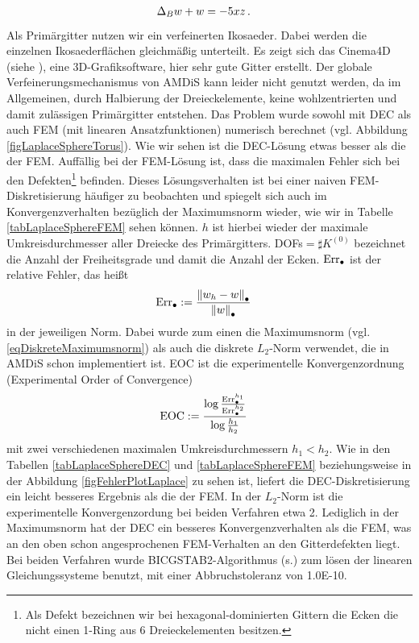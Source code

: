 \begin{beispiel}[Einheitssphäre]
\begin{align}
          \label{eqLaplaceSphereProblemUmform}
         \Delta_{B} w + w &= -5 x z \,\text{.}
       \end{align}
       Als Primärgitter nutzen wir ein verfeinerten Ikosaeder.
       Dabei werden die einzelnen Ikosaederflächen gleichmäßig unterteilt.
       Es zeigt sich das Cinema4D (siehe \cite{cinema4d}), eine 3D-Grafiksoftware, hier sehr gute Gitter erstellt.
       Der globale Verfeinerungsmechanismus von AMDiS kann leider nicht genutzt werden, da im Allgemeinen,
       durch Halbierung der Dreieckelemente, keine wohlzentrierten und damit zulässigen Primärgitter entstehen.
       Das Problem wurde sowohl mit DEC als auch FEM (mit linearen Ansatzfunktionen) 
       numerisch berechnet (vgl. Abbildung \ref{figLaplaceSphereTorus}).
       Wie wir sehen ist die DEC-Lösung etwas besser als die der FEM.
       Auffällig bei der FEM-Lösung ist, dass die maximalen Fehler sich bei den Defekten\footnote{Als Defekt bezeichnen wir bei
       hexagonal-dominierten Gittern die Ecken die nicht einen 1-Ring aus 6 Dreieckelementen besitzen.} 
       befinden.
       Dieses Lösungsverhalten ist bei einer naiven FEM-Diskretisierung häufiger zu beobachten und spiegelt sich auch im
       Konvergenzverhalten bezüglich der Maximumsnorm wieder, wie wir in Tabelle \ref{tabLaplaceSphereFEM} sehen können.
       \( h \) ist hierbei wieder der maximale Umkreisdurchmesser aller Dreiecke des Primärgitters.
       DOFs\( = \sharp K^{(0)} \) bezeichnet die Anzahl der Freiheitsgrade und damit die Anzahl der Ecken.
       \( \text{Err}_{\bullet} \) ist der relative Fehler, das heißt
       \begin{align}
         \text{Err}_{\bullet} &:= \frac{\left\| w_{h} - w \right\|_{\bullet}}{\left\| w \right\|_{\bullet}}
       \end{align}
       in der jeweiligen Norm.
       Dabei wurde zum einen die Maximumsnorm (vgl. \ref{eqDiskreteMaximumsnorm}) als auch die diskrete \(
       L_{2} \)-Norm verwendet,
       die in AMDiS schon implementiert ist.
       EOC ist die experimentelle Konvergenzordnung (Experimental Order of Convergence)
       \begin{align}
         \text{EOC} &:= \frac{\log\frac{\text{Err}_{\bullet}^{h_{1}}}{\text{Err}_{\bullet}^{h_{2}}}}
                             {\log\frac{h_{1}}{h_{2}}}
       \end{align}
       mit zwei verschiedenen maximalen Umkreisdurchmessern \( h_{1} < h_{2} \).
       Wie in den Tabellen \ref{tabLaplaceSphereDEC} und \ref{tabLaplaceSphereFEM} beziehungsweise in der
       Abbildung \ref{figFehlerPlotLaplace} zu sehen ist, liefert die DEC-Diskretisierung ein leicht
       besseres Ergebnis als die der FEM.
       In der \( L_{2} \)-Norm ist die experimentelle Konvergenzordung bei beiden Verfahren etwa 2.
       Lediglich in der Maximumsnorm hat der DEC ein besseres Konvergenzverhalten als die FEM, 
       was an den oben schon
       angesprochenen FEM-Verhalten an den Gitterdefekten liegt.
       Bei beiden Verfahren wurde BICGSTAB2-Algorithmus (s.\cite{bicgstab2}) zum lösen der linearen
       Gleichungssysteme benutzt, mit einer Abbruchstoleranz von 1.0E-10.


\end{beispiel}
